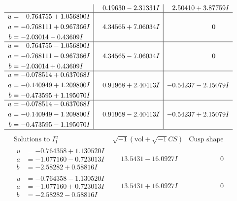 \documentclass[1p]{elsarticle_modified}
\theoremstyle{definition}
\newcommand{\I}{\sqrt{-1}}
\begin{document}
$$\begin{array}{c|c|c}
 & \phantom{-}0.19630 - 2.31331 I & \phantom{-}2.50410 + 3.87759 I \\ \hline\begin{aligned}
u &= \phantom{-}0.764755 + 1.056800 I \\
a &= -0.768111 + 0.967366 I \\
b &= -2.03014 - 0.43609 I\end{aligned}
 & \phantom{-}4.34565 + 7.06034 I & \phantom{-0.000000 } 0 \\ \hline\begin{aligned}
u &= \phantom{-}0.764755 - 1.056800 I \\
a &= -0.768111 - 0.967366 I \\
b &= -2.03014 + 0.43609 I\end{aligned}
 & \phantom{-}4.34565 - 7.06034 I & \phantom{-0.000000 } 0 \\ \hline\begin{aligned}
u &= -0.078514 + 0.637068 I \\
a &= -0.140949 + 1.209800 I \\
b &= -0.473595 + 1.195070 I\end{aligned}
 & \phantom{-}0.91968 + 2.40413 I & -0.54237 - 2.15079 I \\ \hline\begin{aligned}
u &= -0.078514 - 0.637068 I \\
a &= -0.140949 - 1.209800 I \\
b &= -0.473595 - 1.195070 I\end{aligned}
 & \phantom{-}0.91968 - 2.40413 I & -0.54237 + 2.15079 I\\
 \hline 
 \end{array}$$\newpage$$\begin{array}{c|c|c}  
\text{Solutions to }I^u_{1}& \I (\text{vol} + \sqrt{-1}CS) & \text{Cusp shape}\\
 \hline 
\begin{aligned}
u &= -0.764358 + 1.130520 I \\
a &= -1.077160 - 0.723013 I \\
b &= -2.58282 + 0.58816 I\end{aligned}
 & \phantom{-}13.5431 - 16.0927 I & \phantom{-0.000000 } 0 \\ \hline\begin{aligned}
u &= -0.764358 - 1.130520 I \\
a &= -1.077160 + 0.723013 I \\
b &= -2.58282 - 0.58816 I\end{aligned}
 & \phantom{-}13.5431 + 16.0927 I & \phantom{-0.000000 } 0 \\ \hline\begin{aligned}

\end{aligned}
\end{array}$$
\end{document}
